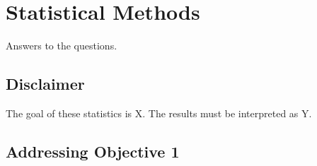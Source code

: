 \section{Statistical Methods}
Answers to the questions.

\subsection{Disclaimer}
The goal of these statistics is X.
The results must be interpreted as Y.

\subsection{Addressing Objective 1}
\todo{}
